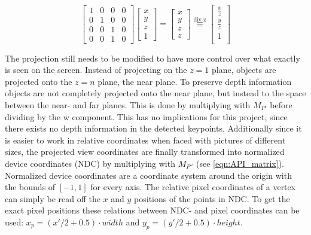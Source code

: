 \documentclass[conference]{IEEEtran}
\begin{document}
\begin{equation}
    \begin{bmatrix}
        1 & 0 & 0 & 0 \\
        0 & 1 & 0 & 0 \\
        0 & 0 & 1 & 0 \\
        0 & 0 & 1 & 0
    \end{bmatrix}
    \begin{bmatrix}
        x \\
        y \\
        z \\
        1
    \end{bmatrix}
    =
    \begin{bmatrix}
        x \\
        y \\
        z \\
        z
    \end{bmatrix}
    \overset{\text{div z}}{\equiv}
    \begin{bmatrix}
        \frac{x}{z} \\
        \frac{y}{z} \\
        1           \\
    \end{bmatrix}
\end{equation}

The projection still needs to be modified to have more control over what exactly is seen on the screen. Instead of projecting on the $z=1$ plane, objects are projected onto the $z=n$ plane, the near plane. To preserve depth information objects are not completely projected onto the near plane, but instead to the space between the near- and far planes. This is done by multiplying with $M_{P'}$ before dividing by the w component. This has no implications for this project, since there exists no depth information in the detected keypoints. Additionally since it is easier to work in relative coordinates when faced with pictures of different sizes, the projected view coordinates are finally transformed into normalized device coordinates (NDC) by multiplying with $M_{P''}$ (see \ref{eqn:API_matrix}). Normalized device coordinates are a coordinate system around the origin with the bounds of $\left[-1, 1\right]$ for every axis. The relative pixel coordinates of a vertex can simply be read off the $x$ and $y$ positions of the points in NDC. To get the exact pixel positions these relations between NDC- and pixel coordinates can be used:  $x_p = ({x'}/{2} + 0.5) \cdot width$ and $y_p = ({y'}/{2} + 0.5) \cdot height$.
\end{document}
